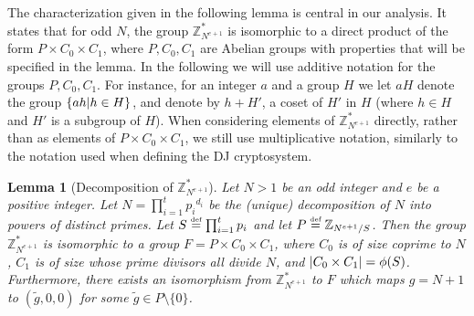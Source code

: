 \documentclass[11pt]{article}
\newtheorem{lemma}[theorem]{Lemma}
\newcommand{\encdj}{{E}_{N,e}}
\newcommand{\Z}{\mathbb{Z}}
\newcommand{\U}[1]{\mathbb{Z}_{#1}^*}
\newcommand{\mathify}[1]{\ifmmode{#1}\else\mbox{$#1$}\fi}
\newcommand{\set}[2][]{\mathify{{\left\{#2\right\}}^{#1}}}
\newcommand{\condset}[2]{\set{#1|#2}}
\newcommand{\size}[1]{\mathify{\left| #1 \right|}}
\newcommand{\order}{{\mathrm{ord}}}
\newcommand{\eqdef}{\stackrel{\mbox{\tiny def}}{{=}}}
\begin{document}
The characterization given in the following lemma is central in our
analysis. It states that for odd $N$, the group $\U{N^{e+1}}$ is
isomorphic to a direct product of the form $P\times C_0\times C_1$,
where $P,C_0,C_1$ are Abelian groups with properties that will be
specified in the lemma. In the following we will use additive
notation for the groups $P,C_0,C_1$. For instance, for an integer $a$
and a group $H$ we let $aH$ denote the group $\condset{ah}{h\in H}$,
and denote by $h+H'$, a coset of $H'$ in $H$ (where $h\in H$ and $H'$
is a subgroup of $H$). When considering elements of $\U{N^{e+1}}$
directly, rather than as elements of $P\times C_0\times C_1$, we
still use multiplicative notation, similarly to the notation used
when defining the DJ cryptosystem.
\begin{lemma}[Decomposition of $\U{N^{e+1}}$]
\label{lem-g-structure} Let $N>1$ be an odd integer and $e$ be a
positive integer.  Let $N=\prod_{i=1}^t{p_i}^{d_i}$ be the (unique)
decomposition of $N$ into powers of distinct primes. Let
$S\eqdef\prod^t_{i=1}p_i$ and let $P\eqdef\Z_{N^{e+1}/S}$. Then the
group $\U{N^{e+1}}$ is isomorphic to a group $F= P\times C_0\times
C_1$, where $C_0$ is of size coprime to $N$, $C_1$ is of size whose
prime divisors all divide $N$, and $\size{C_0\times C_1}=\phi(S)$.
Furthermore, there exists an isomorphism from $\U{N^{e+1}}$ to $F$
which maps $g=N+1$ to $(\tilde{g},0,0)$ for some $\tilde{g}\in
P\setminus\{0\}$.
\end{lemma}

%
\end{document}
